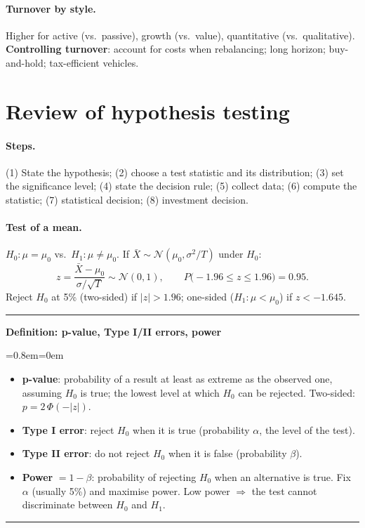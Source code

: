 \documentclass[11pt,a4paper]{report}
\newenvironment{notebox}[1]
  {\par\medskip\Needspace{6\baselineskip}\noindent\rule{\linewidth}{0.4pt}\par\nopagebreak
   \noindent\textbf{#1}\par\nopagebreak
   \begin{list}{}{\leftmargin=0.8em\rightmargin=0em\topsep=2pt}\item[]}
  {\end{list}\nopagebreak\noindent\rule{\linewidth}{0.4pt}\par\medskip}
\newenvironment{definitionbox}[1]{\begin{notebox}{Definition: #1}}{\end{notebox}}
\begin{document}
\paragraph{Turnover by style.} Higher for active (vs.\ passive), growth (vs.\
value), quantitative (vs.\ qualitative). \textbf{Controlling turnover}: account
for costs when rebalancing; long horizon; buy-and-hold; tax-efficient vehicles.

\section{Review of hypothesis testing}
\paragraph{Steps.} (1) State the hypothesis; (2) choose a test statistic and its
distribution; (3) set the significance level; (4) state the decision rule;
(5) collect data; (6) compute the statistic; (7) statistical decision;
(8) investment decision.

\paragraph{Test of a mean.} $H_0:\mu=\mu_0$ vs.\ $H_1:\mu\ne\mu_0$. If
$\bar X\sim\mathcal N(\mu_0,\sigma^2/T)$ under $H_0$:
\[
z=\frac{\bar X-\mu_0}{\sigma/\sqrt T}\sim\mathcal N(0,1),\qquad
P\big(-1.96\le z\le1.96\big)=0.95 .
\]
Reject $H_0$ at 5\% (two-sided) if $|z|>1.96$; one-sided ($H_1:\mu<\mu_0$) if
$z<-1.645$.

\begin{definitionbox}{p-value, Type I/II errors, power}
\begin{itemize}
  \item \textbf{p-value}: probability of a result at least as extreme as the
    observed one, assuming $H_0$ is true; the lowest level at which $H_0$ can be
    rejected. Two-sided: $p=2\,\Phi(-|z|)$.
  \item \textbf{Type I error}: reject $H_0$ when it is true (probability $\alpha$, the level of the test).
  \item \textbf{Type II error}: do not reject $H_0$ when it is false (probability $\beta$).
  \item \textbf{Power} $=1-\beta$: probability of rejecting $H_0$ when an
    alternative is true. Fix $\alpha$ (usually 5\%) and maximise power. Low power
    $\Rightarrow$ the test cannot discriminate between $H_0$ and $H_1$.
\end{itemize}
\end{definitionbox}
\end{document}
